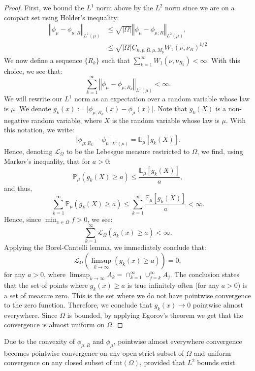 \documentclass{amsart}
\theoremstyle{lemma}
\theoremstyle{remark}
\begin{document}
\begin{proof}
First, we bound the $L^1$ norm above by the $L^2$ norm since we are on a compact set using H\"{o}lder's inequality:
\begin{align}
\left\Vert \phi_{\mu} - \phi_{\mu;R} \right\Vert_{L^1(\mu)} &\leq  \sqrt{\vert \Omega \vert} \left\Vert \phi_{\mu} - \phi_{\mu;R} \right\Vert_{L^2(\mu)}, \\
&\leq \sqrt{\vert \Omega \vert} C_{n, p, \overline{\Omega}, \mu, M_{p}}  W_{1}(\nu, \nu_{R})^{1/2}
\end{align}
We now define a sequence $\{R_k\}$ such that $\sum_{k=1}^{\infty} W_1(\nu, \nu_{R_{k}}) <\infty$. With this choice, we see that:
\begin{equation}
\sum_{k=1}^{\infty} \left\Vert \phi_{\mu} - \phi_{\mu;R_{k}} \right\Vert_{L^1(\mu)} <\infty.
\end{equation}
We will rewrite our $L^1$ norm as an expectation over a random variable whose law is $\mu$. We denote $g_k(x) := \vert \phi_{\mu;R_{k}}(x) - \phi_{\mu}(x) \vert$. Note that $g_{k}(X)$ is a non-negative random variable, where $X$ is the random variable whose law is $\mu$. With this notation, we write:
\begin{equation}
\Vert \phi_{\mu;R_{k}}-\phi_{\mu} \Vert_{L^1(\mu)} = \mathbb{E}_{\mu} [g_k(X)].
\end{equation}
Hence, denoting $\mathcal{L}_{\Omega}$ to be the Lebesgue measure restricted to $\Omega$, we find, using Markov's inequality, that for $a>0$:
\begin{equation}
\mathbb{P}_{\mu}(g_k(X) \geq a) \leq \frac{\mathbb{E}_{\mu} [g_k(X)]}{a},
\end{equation}
and thus,
\begin{equation}
\sum_{k=1}^{\infty} \mathbb{P}_{\mu}(g_k(X) \geq a) \leq \sum_{k=1}^{\infty} \frac{\mathbb{E}_{\mu} [g_k(X)]}{a} <\infty.
\end{equation}
Hence, since $\min_{x \in \overline{\Omega}} f >0$, we see:
\begin{equation}
\sum_{k=1}^{\infty} \mathcal{L}_{\Omega} (g_k(x) \geq a) < \infty.
\end{equation}
Applying the Borel-Cantelli lemma, we immediately conclude that:
\begin{equation}
\mathcal{L}_{\Omega} \left( \limsup_{k \rightarrow \infty} (g_k(x) \geq a) \right) = 0,
\end{equation}
for any $a>0$, where $\limsup_{k \rightarrow \infty} A_k = \cap_{k=1}^{\infty} \cup_{j=k}^{\infty} A_j$. The conclusion states that the set of points where $g_k(x) \geq a$ is true infinitely often (for any $a>0$) is a set of measure zero. This is the set where we do not have pointwise convergence to the zero function. Therefore, we conclude that $g_{k}(x) \rightarrow 0$ pointwise almost everywhere. Since $\Omega$ is bounded, by applying Egorov's theorem we get that the convergence is almost uniform on $\Omega$.
\end{proof}
Due to the convexity of $\phi_{\mu;R}$ and $\phi_{\mu}$, pointwise almost everywhere convergence becomes pointwise convergence on any open strict subset of $\Omega$ and uniform convergence on any closed subset of $\text{int}(\Omega)$, provided that $L^2$ bounds exist.
\end{document}
